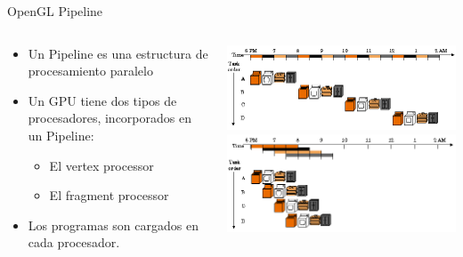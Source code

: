 \documentclass[aspectratio=169,compress]{beamer}
\begin{document}



\begin{frame}{OpenGL Pipeline}

\begin{columns}
\begin{column}{0.45\textwidth}
\begin{itemize}
\item Un Pipeline es una estructura de procesamiento paralelo
\item Un GPU tiene dos tipos de procesadores, incorporados en un Pipeline:
\begin{itemize}
\item El vertex processor
\item El fragment processor
\end{itemize}
\item Los programas son cargados en cada procesador.
\end{itemize}
\end{column}
\begin{column}{0.45\textwidth}
    \includegraphics[width=\textwidth]{FigsOpenGL/Pipeline1.png}\\
    \includegraphics[width=\textwidth]{FigsOpenGL/Pipeline2.png}    
\end{column}
\end{columns}

\end{frame}
\end{document}
